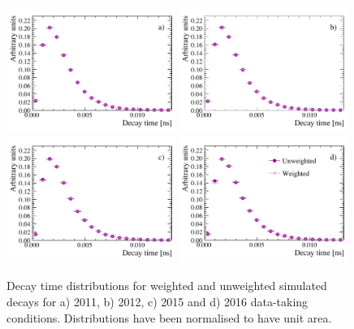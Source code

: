 \clearpage
\begin{figure}[tbp]
  \centering
    \includegraphics[width=0.49\textwidth]{./Figs/LifetimeMeasurement/2011_DT_Bs2MuMu.pdf}
    \includegraphics[width=0.49\textwidth]{./Figs/LifetimeMeasurement/2012_DT_Bs2MuMu.pdf}
    \includegraphics[width=0.49\textwidth]{./Figs/LifetimeMeasurement/2015_DT_Bs2MuMu.pdf}
    \includegraphics[width=0.49\textwidth]{./Figs/LifetimeMeasurement/2016_DT_Bs2MuMu.pdf}
  \caption{Decay time distributions for weighted and unweighted \bsmumu simulated decays for a) 2011, b) 2012, c) 2015 and d) 2016 data-taking conditions. Distributions have been normalised to have unit area.}
  \label{fig:BsmmDT}
\end{figure}

